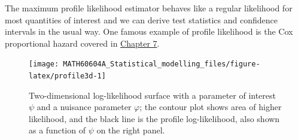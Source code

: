 \documentclass[
  11pt,
  letterpaper,
]{book}
\theoremstyle{definition}
\theoremstyle{definition}
\theoremstyle{definition}
\theoremstyle{remark}
\begin{document}
The maximum profile likelihood estimator behaves like a regular likelihood for most quantities of interest and we can derive test statistics and confidence intervals in the usual way. One famous example of profile likelihood is the Cox proportional hazard covered in \protect\hyperlink{survival}{Chapter 7}.

\begin{figure}

{\centering \texttt{[image: MATH60604A\_Statistical\_modelling\_files/figure-latex/profile3d-1]} 

}

\caption{Two-dimensional log-likelihood surface with a parameter of interest $\psi$ and a nuisance parameter $\varphi$; the contour plot shows area of higher likelihood, and the black line is the profile log-likelihood, also shown as a function of $\psi$ on the right panel.}\label{fig:profile3d}
\end{figure}
\end{document}
